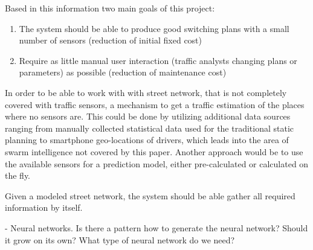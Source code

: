 Based in this information two main goals of this project:

\begin{enumerate}
	\item The system should be able to produce good switching plans with a small number of sensors (reduction of initial fixed cost)
	\item Require as little manual user interaction (traffic analysts changing plans or parameters) as possible (reduction of maintenance cost)
\end{enumerate}

In order to be able to work with with street network, that is not completely covered with traffic sensors, a mechanism to get a traffic estimation of the places where no sensors are. This could be done by utilizing additional data sources ranging from manually collected statistical data used for the traditional static planning to smartphone geo-locations of drivers, which leads into the area of swarm intelligence not covered by this paper. Another approach would be to use the available sensors for a prediction model, either pre-calculated or calculated on the fly.

Given a modeled street network, the system should be able gather all required information by itself. 


- Neural networks. Is there a pattern how to  generate the neural network? Should it grow on its own? What type of neural network do we need?

